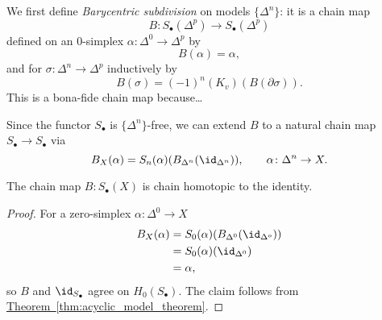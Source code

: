 \documentclass[main.tex]{subfiles}
\begin{document}
We first define \emph{Barycentric subdivision} on models \(\{\Delta^{n}\}\): it is a chain map
\begin{equation*}
  B\colon S_{\bullet}(\Delta^{p}) \to S_{\bullet}(\Delta^{p})
\end{equation*}
defined on an \(0\)-simplex \(\alpha\colon \Delta^{0} \to \Delta^{p}\) by
\begin{equation*}
  B(\alpha) = \alpha,
\end{equation*}
and for \(\sigma\colon \Delta^{n} \to \Delta^{p}\) inductively by
\begin{equation*}
  B(\sigma) = (-1)^{n}(K_{v})(B(\partial \sigma)).
\end{equation*}
This is a bona-fide chain map because\dots

Since the functor \(S_{\bullet}\) is \(\{\Delta^{n}\}\)-free, we can extend \(B\) to a natural chain map \(S_{\bullet} \to S_{\bullet}\) via
\begin{equation*}
  B_{X}(\alpha) = S_{n}(\alpha)(B_{\Delta^{n}}(\id_{\Delta^{n}})),\qquad \alpha\colon \Delta^{n} \to X.
\end{equation*}

\begin{theorem}
  The chain map \(B\colon S_{\bullet}(X)\) is chain homotopic to the identity.
\end{theorem}
\begin{proof}
  For a zero-simplex \(\alpha\colon \Delta^{0} \to X\)
  \begin{align*}
    B_{X}(\alpha) &= S_{0}(\alpha)(B_{\Delta^{0}}(\id_{\Delta^{o}})) \\
    &= S_{0}(\alpha)(\id_{\Delta^{0}}) \\
    &= \alpha,
  \end{align*}
  so \(B\) and \(\id_{S_{\bullet}}\) agree on \(H_{0}(S_{\bullet})\). The claim follows from \hyperref[thm:acyclic_model_theorem]{Theorem~\ref*{thm:acyclic_model_theorem}}.
\end{proof}
\end{document}
